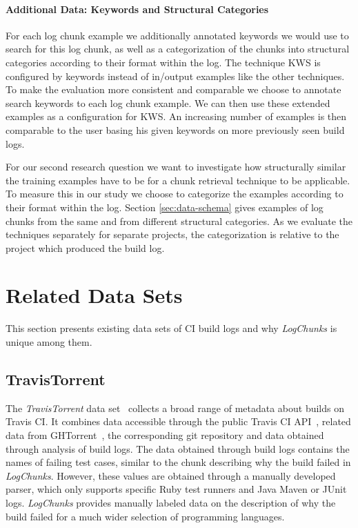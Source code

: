\documentclass[\myrootdir/main.tex]{subfiles}
\begin{document}
\paragraph{Additional Data: Keywords and Structural Categories}
For each log chunk example we additionally annotated keywords we would use to search for this log chunk, as well as a categorization of the chunks into structural categories according to their format within the log.
The technique KWS is configured by keywords instead of in/output examples like the other techniques.
To make the evaluation more consistent and comparable we choose to annotate search keywords to each log chunk example.
We can then use these extended examples as a configuration for KWS.
An increasing number of examples is then comparable to the user basing his given keywords on more previously seen build logs.

For our second research question we want to investigate how structurally similar the training examples have to be for a chunk retrieval technique to be applicable.
To measure this in our study we choose to categorize the examples according to their format within the log.
Section \ref{sec:data-schema} gives examples of log chunks from the same and from different structural categories.
As we evaluate the techniques separately for separate projects, the categorization is relative to the project which produced the build log.

\section{Related Data Sets}
\label{sec:related-data-sets}
This section presents existing data sets of CI build logs and why \emph{LogChunks} is unique among them.

\subsection{TravisTorrent}
The \emph{TravisTorrent} data set~\cite{beller2017travistorrent} collects a broad range of metadata about builds on Travis CI\@.
It combines data accessible through the public Travis CI API~\cite{travisci2019apidoc}, related data from GHTorrent~\cite{gousios2013ghtorrent}, the corresponding git repository and data obtained through analysis of build logs.
The data obtained through build logs contains the names of failing test cases, similar to the chunk describing why the build failed in \emph{LogChunks}.
However, these values are obtained through a manually developed parser, which only supports specific Ruby test runners and Java Maven or JUnit logs.
\emph{LogChunks} provides manually labeled data on the description of why the build failed for a much wider selection of programming languages.
\end{document}
